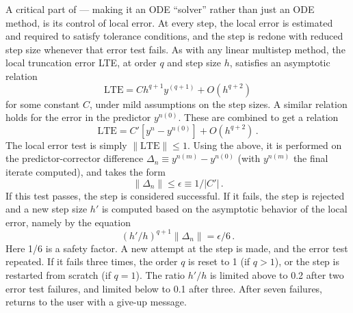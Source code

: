 A critical part of {\cvode} --- making it an ODE ``solver'' rather than
just an ODE method, is its control of local error.  At every step, the
local error is estimated and required to satisfy tolerance conditions,
and the step is redone with reduced step size whenever that error test
fails.  As with any linear multistep method, the local truncation
error LTE, at order $q$ and step size $h$, satisfies an asymptotic
relation
\[ \mbox{LTE} = C h^{q+1} y^{(q+1)} + O(h^{q+2}) \]
for some constant $C$, under mild assumptions on the step sizes.
A similar relation holds for the error in the predictor $y^{n(0)}$.
These are combined to get a relation
\[ \mbox{LTE} = C' [y^n - y^{n(0)}] + O(h^{q+2}) \, . \]
The local error test is simply $\|\mbox{LTE}\| \leq 1$.  Using the above,
it is performed on the predictor-corrector difference 
$\Delta_n \equiv y^{n(m)} - y^{n(0)}$ (with $y^{n(m)}$ the final
iterate computed), and takes the form
\[ \|\Delta_n\| \leq \epsilon \equiv 1/|C'| \, . \]
If this test passes, the step is considered successful.  If it fails,
the step is rejected and a new step size $h'$ is computed based on the
asymptotic behavior of the local error, namely by the equation
\[ (h'/h)^{q+1} \|\Delta_n\| = \epsilon/6 \, . \]
Here 1/6 is a safety factor.  A new attempt at the step is made,
and the error test repeated.  If it fails three times, the order $q$
is reset to 1 (if $q > 1$), or the step is restarted from scratch (if
$q = 1$).  The ratio $h'/h$ is limited above to 0.2 after two error test
failures, and limited below to 0.1 after three.  After seven failures,
{\cvode} returns to the user with a give-up message.

